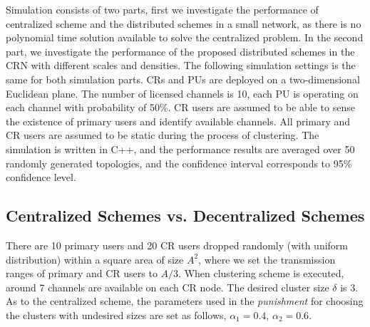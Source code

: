 \documentclass[10pt,journal,compsoc]{IEEEtran}
\theoremstyle{mytheoremstyle}
\theoremstyle{mytheoremstyle}
\theoremstyle{mytheoremstyle}
\begin{document}
Simulation consists of two parts, first we investigate the performance of centralized scheme and the distributed schemes in a small network, as there is no polynomial time solution available to solve the centralized problem.
In the second part, we investigate the performance of the proposed distributed schemes in the CRN with different scales and densities.
The following simulation settings is the same for both simulation parts.
CRs and PUs are deployed on a two-dimensional Euclidean plane.
The number of licensed channels is 10, each PU is operating on each channel with probability of 50\%.
CR users are assumed to be able to sense the existence of primary users and identify available channels.
All primary and CR users are assumed to be static during the process of clustering.
The simulation is written in C++, and the performance results are averaged over 50 randomly generated topologies, and the confidence interval corresponds to 95\% confidence level.


\subsection{Centralized Schemes vs. Decentralized Schemes}
There are 10 primary users and 20 CR users dropped randomly (with uniform distribution) within a square area of size $A^{2}$, where we set the transmission ranges of primary and CR users to $A/3$.
When clustering scheme is executed, around 7 channels are available on each CR node.
The desired cluster size $\delta$ is 3.
As to the centralized scheme, the parameters used in the \textit{punishment} for choosing the clusters with undesired sizes are set as follows, $\alpha_1 =  0.4$, $\alpha_2 =  0.6$.
\end{document}
